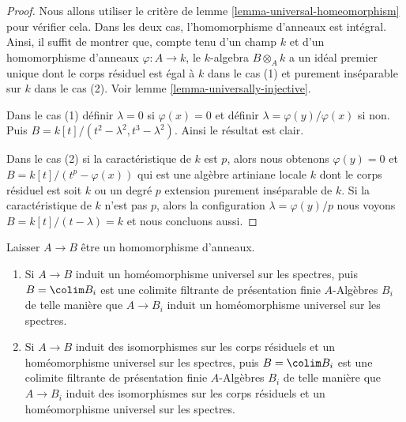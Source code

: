 \begin{proof}
Nous allons utiliser le critère de lemme \ref{lemma-universal-homeomorphism} pour vérifier cela. Dans les deux cas, l'homomorphisme d'anneaux est intégral. Ainsi, il suffit de montrer que, compte tenu d'un champ $k$ et d'un homomorphisme d'anneaux $\varphi : A \to k$, le $k$-algebra $B \otimes_A k$ a un idéal premier unique dont le corps résiduel est égal à $k$ dans le cas (1) et purement inséparable sur $k$ dans le cas (2). Voir lemme \ref{lemma-universally-injective}.

\medskip\noindent
Dans le cas (1) définir $\lambda = 0$ si $\varphi(x) = 0$ et définir $\lambda = \varphi(y)/\varphi(x)$ si non. Puis $B = k[t]/(t^2 - \lambda^2, t^3 - \lambda^2)$. Ainsi le résultat est clair.

\medskip\noindent
Dans le cas (2) si la caractéristique de $k$ est $p$, alors nous obtenons $\varphi(y) = 0$ et $B = k[t]/(t^p - \varphi(x))$ qui est une algèbre artiniane locale $k$ dont le corps résiduel est soit $k$ ou un degré $p$ extension purement inséparable de $k$. Si la caractéristique de $k$ n'est pas $p$, alors la configuration $\lambda = \varphi(y)/p$ nous voyons $B = k[t]/(t - \lambda) = k$ et nous concluons aussi.
\end{proof}

\begin{lemma}

\label{lemma-universal-homeo-limit}

Laisser $A \to B$ être un homomorphisme d'anneaux.

\begin{enumerate}

\item Si $A \to B$ induit un homéomorphisme universel sur les spectres, puis $B = \colim B_i$ est une colimite filtrante de présentation finie $A$-Algèbres
$B_i$ de telle manière que $A \to B_i$ induit un homéomorphisme universel sur les spectres.
\item Si $A \to B$ induit des isomorphismes sur les corps résiduels et un homéomorphisme universel sur les spectres, puis $B = \colim B_i$ est une colimite filtrante de présentation finie $A$-Algèbres $B_i$ de telle manière que
$A \to B_i$ induit des isomorphismes sur les corps résiduels et un homéomorphisme universel sur les spectres.

\end{enumerate}

\end{lemma}

